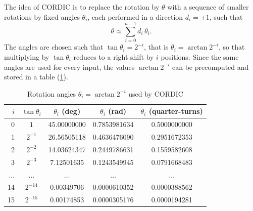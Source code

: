 The idea of CORDIC is to replace the rotation by $\theta$ with a sequence of smaller rotations by fixed angles $\theta_{i}$, each performed in a direction
$d_{i} = \pm 1$, such that
\begin{equation}
  \theta \approx \sum_{i=0}^{n-1} d_{i}\,\theta_{i}.
  \label{eq:angle-sum}
\end{equation}
The angles are chosen such that $\tan\theta_{i} = 2^{-i}$, that is $\theta_{i} = \arctan 2^{-i}$, so that multiplying by $\tan\theta_{i}$ reduces to a right shift by $i$ positions. Since the same angles are used for every input, the values $\arctan 2^{-i}$ can be precomputed and stored in a table
(\cref{tab:precompval}).

\begin{table}[H]
  \centering
  \caption{Rotation angles $\theta_{i} = \arctan 2^{-i}$ used by CORDIC}
  \label{tab:precompval}
  \begin{tabular}{rcccc}
    \toprule
    $i$ & $\tan\theta_{i}$ & $\theta_{i}$ (deg) & $\theta_{i}$ (rad)
    & $\theta_{i}$ (quarter-turns) \\
    \midrule
    0  & $1$       & 45.00000000 & 0.7853981634 & 0.5000000000 \\
    1  & $2^{-1}$  & 26.56505118 & 0.4636476090 & 0.2951672353 \\
    2  & $2^{-2}$  & 14.03624347 & 0.2449786631 & 0.1559582608 \\
    3  & $2^{-3}$  & 7.12501635  & 0.1243549945 & 0.0791668483 \\
    $\dots$ & $\dots$ & $\dots$ & $\dots$ & $\dots$ \\
    14 & $2^{-14}$ & 0.00349706  & 0.0000610352 & 0.0000388562 \\
    15 & $2^{-15}$ & 0.00174853  & 0.0000305176 & 0.0000194281 \\
    \bottomrule
  \end{tabular}
\end{table}

